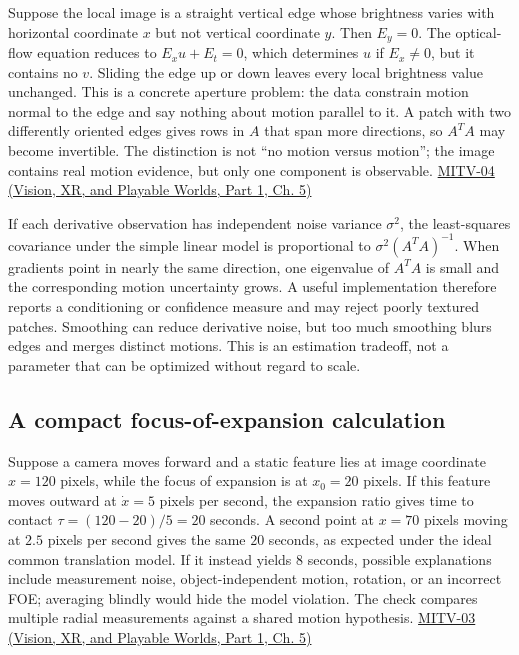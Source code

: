 \hypertarget{04-visual-computing-ii-ch030-flow-why-one-bright-edge-cannot-reveal-full-motion}{}

Suppose the local image is a straight vertical edge whose brightness varies with horizontal coordinate \(x\) but not vertical coordinate \(y\). Then \(E_y=0\). The optical-flow equation reduces to \(E_xu+E_t=0\), which determines \(u\) if \(E_x\ne0\), but it contains no \(v\). Sliding the edge up or down leaves every local brightness value unchanged. This is a concrete aperture problem: the data constrain motion normal to the edge and say nothing about motion parallel to it. A patch with two differently oriented edges gives rows in \(A\) that span more directions, so \(A^TA\) may become invertible. The distinction is not ``no motion versus motion''; the image contains real motion evidence, but only one component is observable. \href{../07-Vision-XR-and-Playable-Worlds-P01/main.pdf\#nameddest=04-visual-computing-ii-ch036-mitv-04---fixed-optical-flow-optical-mouse-constant-brightness-assumption-closed-form-solution}{MITV-04 (Vision, XR, and Playable Worlds, Part 1, Ch. 5)}

If each derivative observation has independent noise variance \(\sigma^2\), the least-squares covariance under the simple linear model is proportional to \(\sigma^2(A^TA)^{-1}\). When gradients point in nearly the same direction, one eigenvalue of \(A^TA\) is small and the corresponding motion uncertainty grows. A useful implementation therefore reports a conditioning or confidence measure and may reject poorly textured patches. Smoothing can reduce derivative noise, but too much smoothing blurs edges and merges distinct motions. This is an estimation tradeoff, not a parameter that can be optimized without regard to scale.

\subsection{A compact focus-of-expansion calculation}\label{04-visual-computing-ii-ch030-a-compact-focus-of-expansion-calculation}

\hypertarget{04-visual-computing-ii-ch030-a-compact-focus-of-expansion-calculation}{}

Suppose a camera moves forward and a static feature lies at image coordinate \(x=120\) pixels, while the focus of expansion is at \(x_0=20\) pixels. If this feature moves outward at \(\dot x=5\) pixels per second, the expansion ratio gives time to contact \(\tau=(120-20)/5=20\) seconds. A second point at \(x=70\) pixels moving at \(2.5\) pixels per second gives the same \(20\) seconds, as expected under the ideal common translation model. If it instead yields \(8\) seconds, possible explanations include measurement noise, object-independent motion, rotation, or an incorrect FOE; averaging blindly would hide the model violation. The check compares multiple radial measurements against a shared motion hypothesis. \href{../07-Vision-XR-and-Playable-Worlds-P01/main.pdf\#nameddest=04-visual-computing-ii-ch036-mitv-03---time-to-contact-focus-of-expansion-direct-motion-vision-methods-noise-gain}{MITV-03 (Vision, XR, and Playable Worlds, Part 1, Ch. 5)}

